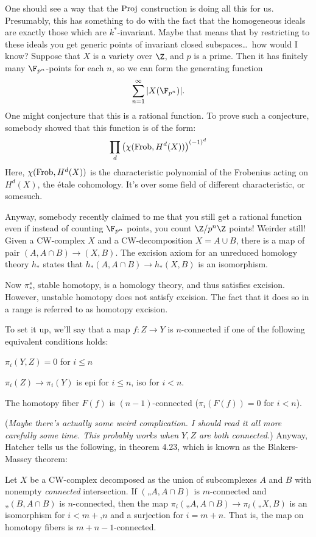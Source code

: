 \documentclass[11pt]{article}
\begin{document}
One should see a way that the $\operatorname{Proj}$ construction is doing all this for us.
Presumably, this has something to do with the fact that the homogeneous ideals
are exactly those which are $k^*$-invariant. Maybe that means that by
restricting to these ideals you get generic points of invariant closed
subspaces\ldots\ how would I know?
Suppose that $X$ is a variety over $\Z$, and $p$ is a prime. Then it has
finitely many $\F_{p^n}$-points for each $n$, so we can form the generating
function
\[\sum_{n=1}^\infty|X(\F_{p^n})|.\]
One might conjecture that this is a rational function. To prove such a
conjecture, somebody showed that this function is of the form:
\[\prod_{d}\left(\chi(\operatorname{Frob},H^d(X))\right)^{(-1)^d}\]
Here, $\chi(\operatorname{Frob},H^d(X))$ is the characteristic polynomial of the Frobenius
acting on $H^d(X)$, the \'etale cohomology. It's over some field of different
characteristic, or somesuch.

Anyway, somebody recently claimed to me that you still get a rational function
even if instead of counting $\F_{p^n}$ points, you count $\Z/p^n\Z$ points!
Weirder still!
Given a CW-complex $X$ and a CW-decomposition $X=A\cup B$, there is a map of
pair $(A,A\cap B)\to (X,B)$. The excision axiom for an unreduced homology theory
$h_*$ states that $h_*(A,A\cap B)\to h_*(X,B)$ is an isomorphism.

Now $\pi_*^s$, stable homotopy, is a homology theory, and thus satisfies
excision. However, unstable homotopy does not satisfy excision. The fact that it
does so in a range is referred to as homotopy excision.

To set it up, we'll say that a map $f:Z\to Y$ is $n$-connected if one of the
following equivalent conditions holds:
\begin{itemise}
\item $\pi_i(Y,Z)=0$ for $i\leq n$
\item $\pi_i(Z)\to\pi_i(Y)$ is epi for $i\leq n$, iso for $i<n$.
\item The homotopy fiber $F(f)$ is $(n-1)$-connected ($\pi_i(F(f))=0$ for
$i<n$).
\end{itemise}
{\small (\emph{Maybe there's actually some weird complication. I should read it
all more carefully some time. This probably works when $Y,Z$ are both
connected.})} Anyway, Hatcher tells us the following, in theorem 4.23, which is
known as the Blakers-Massey theorem:
\begin{thm*}Let $X$ be a CW-complex decomposed as the union of subcomplexes $A$
and $B$ with nonempty \emph{connected} intersection. If $(A,A\cap B)$ is
$m$-connected and $(B,A\cap B)$ is $n$-connected, then the map
$\pi_i(A,A\cap B)\to\pi_i(X,B)$ is an isomorphism for $i<m+n$ and a
surjection for $i= m+n$. That is, the map on homotopy fibers is
$m+n-1$-connected.
\end{thm*}
\end{document}
